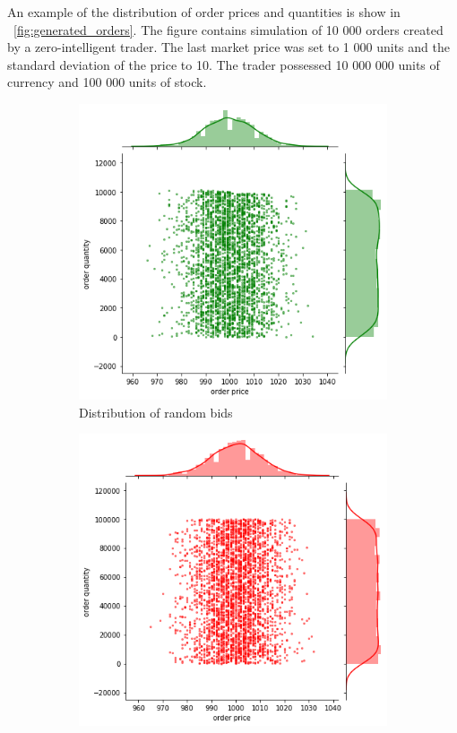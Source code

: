 An example of the distribution of order prices and quantities
is show in ~\ref{fig:generated_orders}. The figure contains simulation
of 10 000 orders created by a zero-intelligent trader. 
The last market price was set to 1 000 units and the standard deviation of the price to 10. 
The trader possessed 10 000 000 units of currency and 100 000 
units of stock.

\begin{figure}
    \centering
    \begin{subfigure}{.5\textwidth}
      \centering
      \includegraphics[width=\linewidth]{plots/order_distr_bid.png}
      \caption{Distribution of random bids}
      \label{fig:gener_bids}
    \end{subfigure}%
    \begin{subfigure}{.5\textwidth}
      \centering
      \includegraphics[width=\linewidth]{plots/order_distr_ask.png}

\end{subfigure}
\end{figure}
